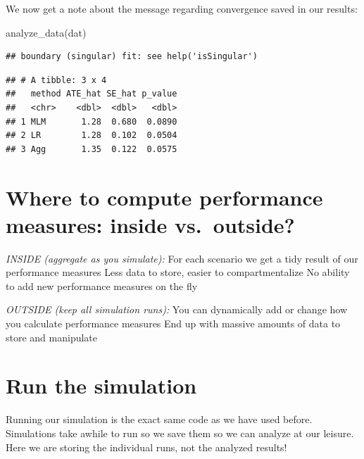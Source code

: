 \documentclass[
]{book}
\newenvironment{Shaded}{\begin{snugshade}}{\end{snugshade}}
\newcommand{\FunctionTok}[1]{\textcolor[rgb]{0.00,0.00,0.00}{#1}}
\newcommand{\NormalTok}[1]{#1}
\begin{document}
We now get a note about the message regarding convergence saved in our results:

\begin{Shaded}
\begin{Highlighting}[]
\FunctionTok{analyze\_data}\NormalTok{(dat)}
\end{Highlighting}
\end{Shaded}

\begin{verbatim}
## boundary (singular) fit: see help('isSingular')
\end{verbatim}

\begin{verbatim}
## # A tibble: 3 x 4
##   method ATE_hat SE_hat p_value
##   <chr>    <dbl>  <dbl>   <dbl>
## 1 MLM       1.28  0.680  0.0890
## 2 LR        1.28  0.102  0.0504
## 3 Agg       1.35  0.122  0.0575
\end{verbatim}

\hypertarget{where-to-compute-performance-measures-inside-vs.-outside}{%
\section{Where to compute performance measures: inside vs.~outside?}\label{where-to-compute-performance-measures-inside-vs.-outside}}

\emph{INSIDE (aggregate as you simulate):}
For each scenario we get a tidy result of our performance measures
Less data to store, easier to compartmentalize
No ability to add new performance measures on the fly

\emph{OUTSIDE (keep all simulation runs):}
You can dynamically add or change how you calculate performance measures
End up with massive amounts of data to store and manipulate

\hypertarget{run-the-simulation}{%
\section{Run the simulation}\label{run-the-simulation}}

Running our simulation is the exact same code as we have used before.
Simulations take awhile to run so we save them so we can analyze at our leisure.
Here we are storing the individual runs, not the analyzed results!
\end{document}
